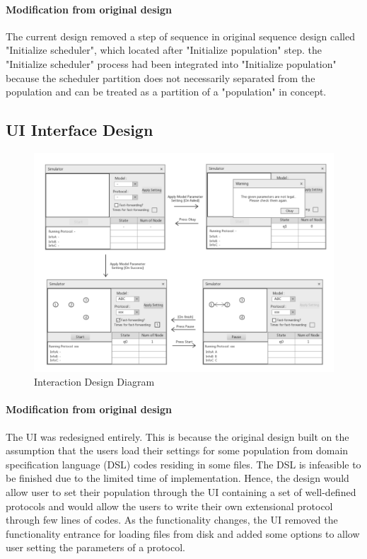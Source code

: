  \paragraph{Modification from original design}
The current design removed a step of sequence in original sequence design called "Initialize scheduler", which located after "Initialize population" step.
the "Initialize scheduler" process had been integrated into "Initialize population" because
the scheduler partition does not necessarily separated from the population and can be treated as a partition of a "population" in concept.

\subsection{UI Interface Design}
\begin{figure}[H]
\begin{center}
\includegraphics[width =\textwidth]{context/diagram/interface.pdf}
\caption{Interaction Design Diagram}
\label{intefaceG}
\end{center}
\end{figure}

\paragraph{Modification from original design}
The UI was redesigned entirely. This is because the original design built on the assumption
that the users load their settings for some population from domain specification language (DSL) codes residing in
some files. The DSL is infeasible to be finished due to the limited time of implementation.
Hence, the design would allow user to set their population through the UI containing a set of well-defined
protocols and would allow the users to write their own extensional protocol through few lines of codes.
As the functionality changes, the UI removed the functionality entrance for loading files from disk and
added some options to allow user setting the parameters of a protocol. 
